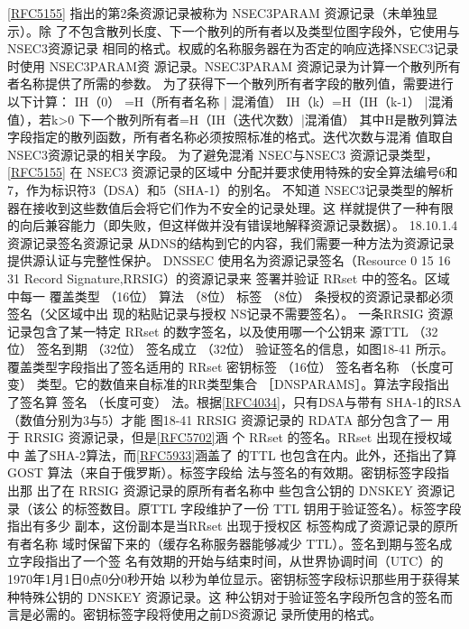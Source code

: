 \href{https://www.rfc-editor.org/rfc/rfc5155}{[RFC5155]} 指出的第2条资源记录被称为 NSEC3PARAM 资源记录（未单独显示）。除
了不包含散列长度、下一个散列的所有者以及类型位图字段外，它使用与NSEC3资源记录
相同的格式。权威的名称服务器在为否定的响应选择NSEC3记录时使用 NSEC3PARAM资
源记录。NSEC3PARAM 资源记录为计算一个散列所有者名称提供了所需的参数。
为了获得下一个散列所有者字段的散列值，需要进行以下计算：
IH（0） =H（所有者名称 | 混淆值）
IH（k）=H（IH（k-1） |混淆值），若k>0
下一个散列所有者=H（IH（迭代次数）|混淆值）
其中H是散列算法字段指定的散列函数，所有者名称必须按照标准的格式。迭代次数与混淆
值取自 NSEC3资源记录的相关字段。
为了避免混淆 NSEC与NSEC3 资源记录类型，\href{https://www.rfc-editor.org/rfc/rfc5155}{[RFC5155]} 在 NSEC3 资源记录的区域中
分配并要求使用特殊的安全算法编号6和7，作为标识符3（DSA）和5（SHA-1）的别名。
不知道 NSEC3记录类型的解析器在接收到这些数值后会将它们作为不安全的记录处理。这
样就提供了一种有限的向后兼容能力（即失败，但这样做并没有错误地解释资源记录数据）。
18.10.1.4 资源记录签名资源记录
从DNS的结构到它的内容，我们需要一种方法为资源记录提供源认证与完整性保护。
DNSSEC 使用名为资源记录签名（Resource
0
15 16
31
Record Signature,RRSIG）的资源记录来
签署并验证 RRset 中的签名。区域中每一
覆盖类型
（16位）
算法
（8位）
标签
（8位）
条授权的资源记录都必须签名（父区域中出
现的粘贴记录与授权 NS记录不需要签名）。
一条RRSIG 资源记录包含了某一特定
RRset 的数字签名，以及使用哪一个公钥来
源TTL
（32位）
签名到期
（32位）
签名成立
（32位）
验证签名的信息，如图18-41 所示。
覆盖类型字段指出了签名适用的 RRset
密钥标签
（16位）
签名者名称
（长度可变）
类型。它的数值来自标准的RR类型集合
［DNSPARAMS］。算法字段指出了签名算
签名
（长度可变）
法。根据\href{https://www.rfc-editor.org/rfc/rfc4034}{[RFC4034]}，只有DSA与带有
SHA-1的RSA（数值分别为3与5）才能
图18-41
RRSIG 资源记录的 RDATA 部分包含了一
用于 RRSIG 资源记录，但是\href{https://www.rfc-editor.org/rfc/rfc5702}{[RFC5702]}涵
个 RRset 的签名。RRset 出现在授权域中
盖了SHA-2算法，而\href{https://www.rfc-editor.org/rfc/rfc5933}{[RFC5933]}涵盖了
的TTL 也包含在内。此外，还指出了算
GOST 算法（来自于俄罗斯）。标签字段给
法与签名的有效期。密钥标签字段指出那
出了在 RRSIG 资源记录的原所有者名称中
些包含公钥的 DNSKEY 资源记录（该公
的标签数目。原TTL 字段维护了一份 TTL
钥用于验证签名）。标签字段指出有多少
副本，这份副本是当RRset 出现于授权区
标签构成了资源记录的原所有者名称
域时保留下来的（缓存名称服务器能够减少 TTL）。签名到期与签名成立字段指出了一个签
名有效期的开始与结束时间，从世界协调时间（UTC）的1970年1月1日0点0分0秒开始
以秒为单位显示。密钥标签字段标识那些用于获得某种特殊公钥的 DNSKEY 资源记录。这
种公钥对于验证签名字段所包含的签名而言是必需的。密钥标签字段将使用之前DS资源记
录所使用的格式。

